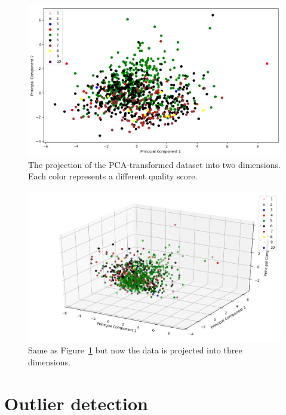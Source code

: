 \documentclass[12pt,preprint]{aastex61}
\begin{document}
 \begin{figure}
 \centering 
 \includegraphics[angle=0,width=130mm]{../output/PCA_2D.png}
 \caption{
   The projection of the PCA-transformed dataset into two dimensions. Each
   color represents a different quality score.
 \label{FIG-PCA-2D}}
 \end{figure}


 \begin{figure}
 \centering 
 \includegraphics[angle=0,width=130mm]{../output/PCA_3D.png}
 \caption{
   Same as Figure~\ref{FIG-PCA-2D} but now the data is projected into three dimensions.
 \label{FIG-PCA-3D}}
 \end{figure}


 \section{Outlier detection \label{outlier}}
\end{document}
